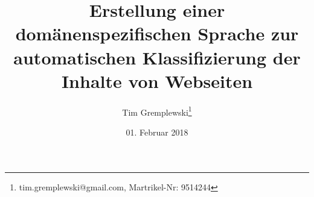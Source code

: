 \documentclass[abstract=on,parskip=half,titlepage,twoside,openright]{scrreprt}
\title{Erstellung einer domänenspezifischen Sprache zur automatischen Klassifizierung der Inhalte von Webseiten}
\author{Tim Gremplewski\thanks{tim.gremplewski@gmail.com, Martrikel-Nr: 9514244}}
\date{01. Februar 2018}
\begin{document}
	\maketitle

	\begin{abstract}
		
	\end{abstract}

	\cleardoublepage

	\begingroup
		\let\cleardoublepage\relax
		\tableofcontents
		\listoffigures
		\listoftables
		\lstlistoflistings
	\endgroup

	\newpage

	
	
	
	
	
	
	
	\appendix
	
	\sloppy
	\printbibliography[heading=bibintoc]
\end{document}
